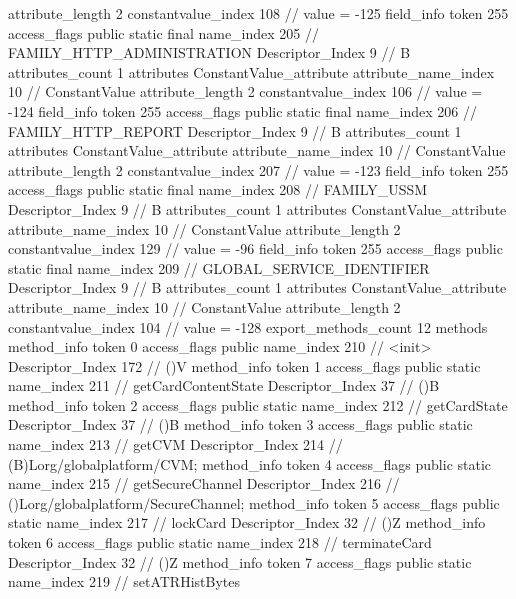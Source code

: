 {{{{{{{					attribute_length	2
					constantvalue_index	108		// value = -125
				}
				}
			}
			field_info {
				token	255
				access_flags	public static final
				name_index	205		// FAMILY_HTTP_ADMINISTRATION
				Descriptor_Index	9		// B
				attributes_count	1
				attributes {
				ConstantValue_attribute {
					attribute_name_index	10		// ConstantValue
					attribute_length	2
					constantvalue_index	106		// value = -124
				}
				}
			}
			field_info {
				token	255
				access_flags	public static final
				name_index	206		// FAMILY_HTTP_REPORT
				Descriptor_Index	9		// B
				attributes_count	1
				attributes {
				ConstantValue_attribute {
					attribute_name_index	10		// ConstantValue
					attribute_length	2
					constantvalue_index	207		// value = -123
				}
				}
			}
			field_info {
				token	255
				access_flags	public static final
				name_index	208		// FAMILY_USSM
				Descriptor_Index	9		// B
				attributes_count	1
				attributes {
				ConstantValue_attribute {
					attribute_name_index	10		// ConstantValue
					attribute_length	2
					constantvalue_index	129		// value = -96
				}
				}
			}
			field_info {
				token	255
				access_flags	public static final
				name_index	209		// GLOBAL_SERVICE_IDENTIFIER
				Descriptor_Index	9		// B
				attributes_count	1
				attributes {
				ConstantValue_attribute {
					attribute_name_index	10		// ConstantValue
					attribute_length	2
					constantvalue_index	104		// value = -128
				}
				}
			}
			}
			export_methods_count	12
			methods {
				method_info {
					token	0
					access_flags	public
					name_index	210		// <init>
					Descriptor_Index	172		// ()V
				}
				method_info {
					token	1
					access_flags	public static
					name_index	211		// getCardContentState
					Descriptor_Index	37		// ()B
				}
				method_info {
					token	2
					access_flags	public static
					name_index	212		// getCardState
					Descriptor_Index	37		// ()B
				}
				method_info {
					token	3
					access_flags	public static
					name_index	213		// getCVM
					Descriptor_Index	214		// (B)Lorg/globalplatform/CVM;
				}
				method_info {
					token	4
					access_flags	public static
					name_index	215		// getSecureChannel
					Descriptor_Index	216		// ()Lorg/globalplatform/SecureChannel;
				}
				method_info {
					token	5
					access_flags	public static
					name_index	217		// lockCard
					Descriptor_Index	32		// ()Z
				}
				method_info {
					token	6
					access_flags	public static
					name_index	218		// terminateCard
					Descriptor_Index	32		// ()Z
				}
				method_info {
					token	7
					access_flags	public static
					name_index	219		// setATRHistBytes
}}}}}
